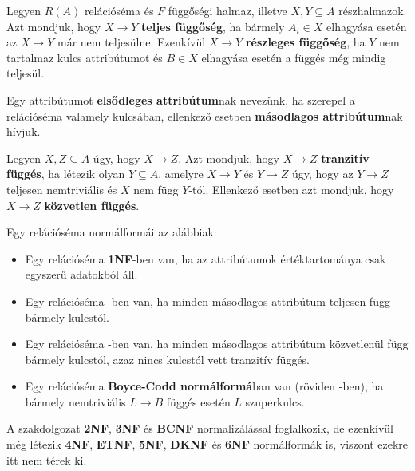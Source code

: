 \begin{defi}
Legyen $R(A)$ relációséma és $F$ függőségi halmaz, illetve $X,Y \subseteq A$ részhalmazok. Azt mondjuk, hogy $X \longrightarrow Y$ \textbf{teljes függőség}, ha bármely $A_i \in X$ elhagyása esetén az $X \longrightarrow Y$ már nem teljesülne. Ezenkívül $X \longrightarrow Y$ \textbf{részleges függőség}, ha $Y$ nem tartalmaz kulcs attribútumot és $B \in X$ elhagyása esetén a függés még mindig teljesül.
\end{defi}

\begin{defi}
Egy attribútumot \textbf{elsődleges attribútum}nak nevezünk, ha szerepel a relációséma valamely kulcsában, ellenkező esetben \textbf{másodlagos attribútum}nak hívjuk.
\end{defi}

\begin{defi}
Legyen $X,Z \subseteq A$ úgy, hogy $X \longrightarrow Z$. Azt mondjuk, hogy $X \longrightarrow Z$ \textbf{tranzitív függés}, ha létezik olyan $Y \subseteq A$, amelyre $X \longrightarrow Y$ és $Y \longrightarrow Z$ úgy, hogy az $Y \longrightarrow Z$ teljesen nemtriviális és $X$ nem függ $Y$-tól. Ellenkező esetben azt mondjuk, hogy $X \longrightarrow Z$ \textbf{közvetlen függés}.
\end{defi}

\begin{defi}[Normálformák]
Egy relációséma normálformái az alábbiak:
\begin{itemize}
    \item Egy relációséma \textbf{1NF}-ben van, ha az attribútumok értéktartománya csak egyszerű adatokból áll.
    \item Egy relációséma \nfk-ben van, ha minden másodlagos attribútum teljesen függ bármely kulcstól.
    \item Egy relációséma \nfh-ben van, ha minden másodlagos attribútum közvetlenül függ bármely kulcstól, azaz nincs kulcstól vett tranzitív függés.
    \item Egy relációséma \textbf{Boyce-Codd normálformá}ban van (röviden \BCNF-ben), ha bármely nemtriviális $L \longrightarrow B$ függés esetén $L$ szuperkulcs.
\end{itemize}
\end{defi}

\begin{megj}
A szakdolgozat \textbf{2NF}, \textbf{3NF} és \textbf{BCNF} normalizálással foglalkozik, de ezenkívül még létezik \textbf{4NF}, \textbf{ETNF}, \textbf{5NF}, \textbf{DKNF} és \textbf{6NF} normálformák is, viszont ezekre itt nem térek ki.
\end{megj}

